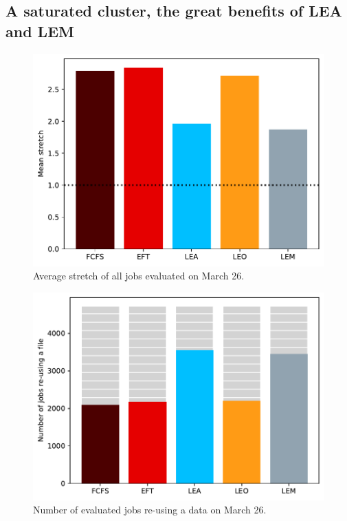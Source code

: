 \documentclass[conference,10pt]{IEEEtran}
\begin{document}
\subsection{A saturated cluster, the great benefits of LEA and LEM}

\begin{figure}[tb]\centering\includegraphics[scale=0.47]{../MBSS/plot/Results_FCFS_Score_Backfill_2022-03-26->2022-03-26_V10000_Mean_Stretch_450_128_32_256_4_1024.pdf}\caption{Average stretch of all jobs evaluated on March 26.}\end{figure}
\begin{figure}[tb]\centering\includegraphics[scale=0.47]{../MBSS/plot/Results_FCFS_Score_Backfill_2022-03-26->2022-03-26_V10000_Number_of_data_reuse_450_128_32_256_4_1024.pdf}\caption{Number of evaluated jobs re-using a data on March 26.}\end{figure}
\end{document}
